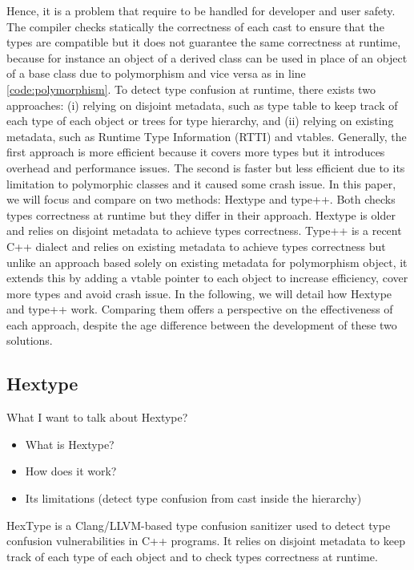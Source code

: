 \documentclass[a4paper,11pt,oneside]{report}
\begin{document}
Hence, it is a problem that require to be handled for developer and user safety. 
The compiler checks statically the correctness of each cast to ensure that the types are compatible but it does not guarantee the same correctness at runtime, 
because for instance an object of a derived class can be used in place of an object of a base class due to polymorphism and vice versa as in line \ref{code:polymorphism}. 
To detect type confusion at runtime, there exists two approaches: (i) relying on disjoint metadata, such as type table to keep track of each type of each object or trees for type hierarchy, and 
(ii) relying on existing metadata, such as Runtime Type Information (RTTI) and vtables. 
Generally, the first approach is more efficient because it covers more types but it introduces overhead and performance issues. The second is faster but less efficient due to its limitation to polymorphic classes and it caused some crash issue. 
In this paper, we will focus and compare on two methods: Hextype and type++. 
Both checks types correctness at runtime but they differ in their approach. Hextype is older and relies on disjoint metadata to achieve types correctness. 
Type++ is a recent C++ dialect and relies on existing metadata to achieve types correctness but unlike an approach based solely on existing metadata for polymorphism object,
it extends this by adding a vtable pointer to each object to increase efficiency, cover more types and avoid crash issue. In the following, we will detail how Hextype and type++ work. 
Comparing them offers a perspective on the effectiveness of each approach, despite the age difference between the development of these two solutions.

\subsection{Hextype}
What I want to talk about Hextype?
\begin{itemize}
       \item What is Hextype?
       \item How does it work?
       \item Its limitations (detect type confusion from cast inside the hierarchy)
\end{itemize}

HexType is a Clang/LLVM-based type confusion sanitizer used to detect type confusion vulnerabilities in C++ programs. 
It relies on disjoint metadata to keep track of each type of each object and to check types correctness at runtime.
\end{document}
